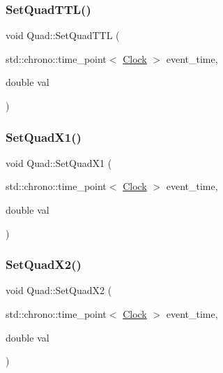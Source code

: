 \mbox{\label{classQuad_a4d3a52272d572315198623e836ac0a97}} 
\subsubsection{\texorpdfstring{Set\+Quad\+T\+T\+L()}{SetQuadTTL()}}
{\footnotesize\ttfamily void Quad\+::\+Set\+Quad\+T\+TL (\begin{DoxyParamCaption}\item[{std\+::chrono\+::time\+\_\+point$<$ \mbox{\hyperlink{universe_8h_a0ef8d951d1ca5ab3cfaf7ab4c7a6fd80}{Clock}} $>$}]{event\+\_\+time,  }\item[{double}]{val }\end{DoxyParamCaption})\hspace{0.3cm}{\ttfamily [inline]}}

\mbox{\label{classQuad_a05fb7c22bfef542b99d04f968b4e18ab}} 
\subsubsection{\texorpdfstring{Set\+Quad\+X1()}{SetQuadX1()}}
{\footnotesize\ttfamily void Quad\+::\+Set\+Quad\+X1 (\begin{DoxyParamCaption}\item[{std\+::chrono\+::time\+\_\+point$<$ \mbox{\hyperlink{universe_8h_a0ef8d951d1ca5ab3cfaf7ab4c7a6fd80}{Clock}} $>$}]{event\+\_\+time,  }\item[{double}]{val }\end{DoxyParamCaption})\hspace{0.3cm}{\ttfamily [inline]}}

\mbox{\label{classQuad_af1df44b73207c3e70b794e889e5225af}} 
\subsubsection{\texorpdfstring{Set\+Quad\+X2()}{SetQuadX2()}}
{\footnotesize\ttfamily void Quad\+::\+Set\+Quad\+X2 (\begin{DoxyParamCaption}\item[{std\+::chrono\+::time\+\_\+point$<$ \mbox{\hyperlink{universe_8h_a0ef8d951d1ca5ab3cfaf7ab4c7a6fd80}{Clock}} $>$}]{event\+\_\+time,  }\item[{double}]{val }\end{DoxyParamCaption})\hspace{0.3cm}{\ttfamily [inline]}}

